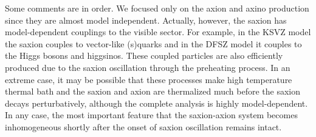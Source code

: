 \documentclass[12pt, a4paper]{article}
\begin{document}
Some comments are in order.
We focused only on the axion and axino production since they are almost model independent.
Actually, however, the saxion has model-dependent couplings to the visible sector.
For example, in the KSVZ model the saxion couples to vector-like (s)quarks and in the DFSZ model 
it couples to the Higgs bosons and higgsinos.
These coupled particles are also efficiently produced due to the saxion oscillation through the preheating process.
In an extreme case, it may be possible that these processes make high temperature thermal bath
and the saxion and axion are thermalized much before the saxion decays perturbatively, 
although the complete analysis is highly model-dependent.
In any case, the most important feature that the saxion-axion system becomes 
inhomogeneous shortly after the onset of saxion oscillation remains intact.
\end{document}
